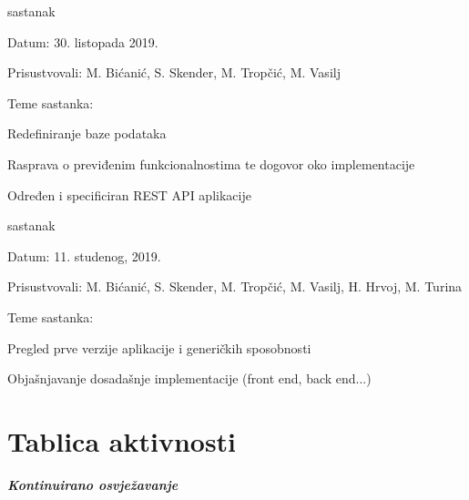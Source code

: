 \begin{packed_enum}
			\item  sastanak
			\item[] \begin{packed_item}
				\item Datum: 30. listopada 2019.
				\item Prisustvovali: M. Bićanić, S. Skender, M. Tropčić, M. Vasilj
				\item Teme sastanka:
				\begin{packed_item}
					\item  Redefiniranje baze podataka
					\item  Rasprava o previđenim funkcionalnostima te dogovor oko implementacije
					\item Određen i specificiran REST API aplikacije
				\end{packed_item}
			\end{packed_item}
		
			\item  sastanak
			\item[] \begin{packed_item}
				\item Datum: 11. studenog, 2019.
				\item Prisustvovali: M. Bićanić, S. Skender, M. Tropčić, M. Vasilj, H. Hrvoj, M. Turina
				\item Teme sastanka:
				\begin{packed_item}
					\item  Pregled prve verzije aplikacije i generičkih sposobnosti
					\item  Objašnjavanje dosadašnje implementacije (front end, back end...)
				\end{packed_item}
			\end{packed_item}
			
		\end{packed_enum}
		
		\eject
		\section*{Tablica aktivnosti}
		
			\textbf{\textit{Kontinuirano osvježavanje}}\\
			
